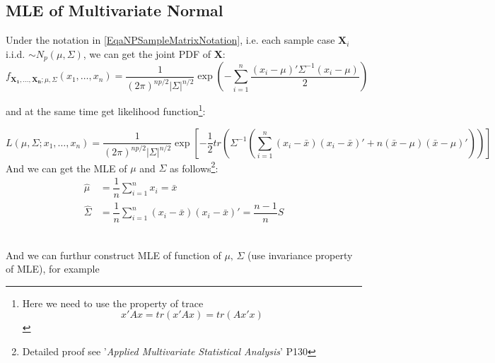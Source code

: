    
    
\subsection{MLE of Multivariate Normal}
    Under the notation in \autoref{EqaNPSampleMatrixNotation}, i.e. each sample case $ \mathbf{X}_i$ i.i.d. $\sim N_p(\mu,\Sigma ) $, we can get the joint PDF of $ \mathbf{X} $:
    \begin{equation}
        f_{\mathbf{X_1},\ldots,\mathbf{X_n};\mu,\Sigma }(x_1,\ldots,x_n)=\dfrac{1}{(2\pi)^{np/2}|\Sigma |^{n/2}}\exp\left( -\sum_{i=1}^n\dfrac{(x_i-\mu)'\Sigma ^{-1}(x_i-\mu)}{2} \right) 
    \end{equation}
  
    and at the same time get likelihood function\footnote{Here we need to use the property of trace
    \begin{equation}
        x'Ax=tr(x'Ax)=tr(Ax'x)
    \end{equation}    }:
    
    \begin{equation}
        L(\mu ,\Sigma;x_1,\ldots,x_n)=\dfrac{1}{(2\pi)^{np/2}|\Sigma |^{n/2}}\exp\left[ -\dfrac{1}{2}tr\left( \Sigma ^{-1} \left(\sum_{i=1}^n(x_i-\bar{x})(x_i-\bar{x})'+n(\bar{x}-\mu)(\bar{x}-\mu)' \right) \right) \right]
    \end{equation}
        And we can get the MLE of $ \mu $ and $ \Sigma  $ as follows\footnote{Detailed proof see '\textit{Applied Multivariate Statistical Analysis}' P130}:
        \begin{align}
            \hat{\mu}&= \dfrac{1}{n}\sum_{i=1}^n x_i=\bar{x} \\
            \hat{\Sigma  }&= \dfrac{1}{n}\sum_{i=1}^n(x_i-\bar{x})(x_i-\bar{x})'=\dfrac{n-1}{n}S
        \end{align}

        \\
    
    And we can furthur construct MLE of function of $ \mu,\,\Sigma  $ (use invariance property of MLE), for example 
    
